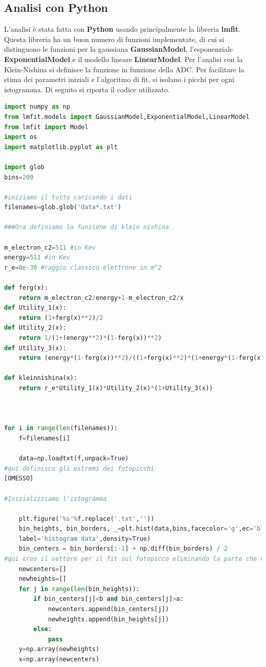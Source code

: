 \documentclass[a4paper]{article}
\begin{document}
\subsection{Analisi con Python}
L'analisi è stata fatta con \textbf{Python} usando principalmente la libreria \textbf{lmfit}. Questa libreria ha un buon numero di funzioni implementate, di cui si distinguono le funzioni per la gaussiana \textbf{GaussianModel}, l'esponenziale \textbf{ExponentialModel} e il modello lineare \textbf{LinearModel}. Per l'analisi con la Klein-Nishina si definisce la funzione in funzione della ADC. Per facilitare la stima dei parametri iniziali e l'algoritmo di fit, si isolano i picchi per ogni istogramma. Di seguito si riporta il codice utilizzato. 
\begin{lstlisting}[language=Python]
import numpy as np
from lmfit.models import GaussianModel,ExponentialModel,LinearModel
from lmfit import Model
import os
import matplotlib.pyplot as plt

import glob
bins=200

#iniziamo il tutto caricando i dati
filenames=glob.glob('data*.txt')

###Ora definiamo la funzione di klein nishina

m_electron_c2=511 #in Kev
energy=511 #in Kev
r_e=8e-30 #raggio classico elettrone in m^2

def ferg(x):
    return m_electron_c2/energy+1-m_electron_c2/x
def Utility_1(x):
    return (1+ferg(x)**2)/2
def Utility_2(x):
    return 1/(1+(energy**2)*(1-ferg(x))**2)
def Utility_3(x):
    return (energy*(1-ferg(x))**2)/((1+ferg(x)**2)*(1+energy*(1-ferg(x))))

def kleinnishina(x):
    return r_e*Utility_1(x)*Utility_2(x)*(1+Utility_3(x))



for i in range(len(filenames)):
    f=filenames[i]

    data=np.loadtxt(f,unpack=True)
#qui definisco gli estremi dei fotopicchi
[OMESSO]

#Inizializziamo l'istogramma

    plt.figure('%s'%f.replace('.txt',''))
    bin_heights, bin_borders, _=plt.hist(data,bins,facecolor='g',ec='black',alpha=0.5,
    label='histogram data',density=True)
    bin_centers = bin_borders[:-1] + np.diff(bin_borders) / 2
#qui creo il vettore per il fit sul fotopicco eliminando la parte che non interessa
    newcenters=[]
    newheights=[]
    for j in range(len(bin_heights)):
        if bin_centers[j]<b and bin_centers[j]>a:
            newcenters.append(bin_centers[j])
            newheights.append(bin_heights[j])
        else:
            pass
    y=np.array(newheights)
    x=np.array(newcenters)


\end{lstlisting}
\end{document}
